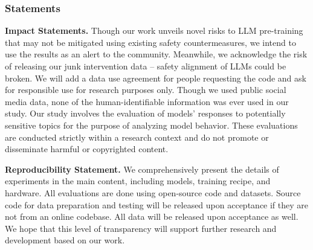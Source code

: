 \subsubsection*{Statements}

\textbf{Impact Statements.}
Though our work unveils novel risks to LLM pre-training that may not be mitigated using existing safety countermeasures, we intend to use the results as an alert to the community. 
Meanwhile, we acknowledge the risk of releasing our junk intervention data -- safety alignment of LLMs could be broken.
We will add a data use agreement for people requesting the code and ask for responsible use for research purposes only.
Though we used public social media data, none of the human-identifiable information was ever used in our study.
Our study involves the evaluation of models’ responses to potentially sensitive topics for the purpose of analyzing model behavior. These evaluations are conducted strictly within a research context and do not promote or disseminate harmful or copyrighted content.

\textbf{Reproducibility Statement.} 
We comprehensively present the details of experiments in the main content, including models, training recipe, and hardware.
All evaluations are done using open-source code and datasets.
Source code for data preparation and testing will be released upon acceptance if they are not from an online codebase. All data will be released upon acceptance as well.
We hope that this level of transparency will support further research and development based on our work.

